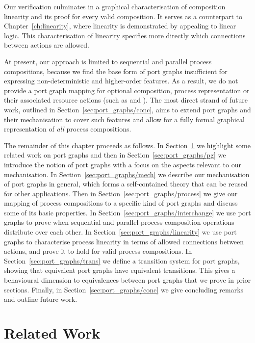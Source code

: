 \documentclass[class=smolathesis,crop=false]{standalone}
\begin{document}
Our verification culminates in a graphical characterisation of composition linearity and its proof for every valid composition.
It serves as a counterpart to Chapter~\ref{ch:linearity}, where linearity is demonstrated by appealing to linear logic.
This characterisation of linearity specifies more directly which connections between actions are allowed.

At present, our approach is limited to sequential and parallel process compositions, because we find the base form of port graphs insufficient for expressing non-deterministic and higher-order features.
As a result, we do not provide a port graph mapping for optional composition, process representation or their associated resource actions (such as  and ).
The most direct strand of future work, outlined in Section~\ref{sec:port_graphs/conc}, aims to extend port graphs and their mechanisation to cover such features and allow for a fully formal graphical representation of \emph{all} process compositions.

The remainder of this chapter proceeds as follows.
In Section~\ref{sec:port_graphs/rel} we highlight some related work on port graphs and then in Section~\ref{sec:port_graphs/pg} we introduce the notion of port graphs with a focus on the aspects relevant to our mechanisation.
In Section~\ref{sec:port_graphs/mech} we describe our mechanisation of port graphs in general, which forms a self-contained theory that can be reused for other applications.
Then in Section~\ref{sec:port_graphs/process} we give our mapping of process compositions to a specific kind of port graphs and discuss some of its basic properties.
In Section~\ref{sec:port_graphs/interchange} we use port graphs to prove when sequential and parallel process composition operations distribute over each other.
In Section~\ref{sec:port_graphs/linearity} we use port graphs to characterise process linearity in terms of allowed connections between actions, and prove it to hold for valid process compositions.
In Section~\ref{sec:port_graphs/trans} we define a transition system for port graphs, showing that equivalent port graphs have equivalent transitions.
This gives a behavioural dimension to equivalences between port graphs that we prove in prior sections.
Finally, in Section~\ref{sec:port_graphs/conc} we give concluding remarks and outline future work.

\section{Related Work}
\label{sec:port_graphs/rel}
\end{document}
